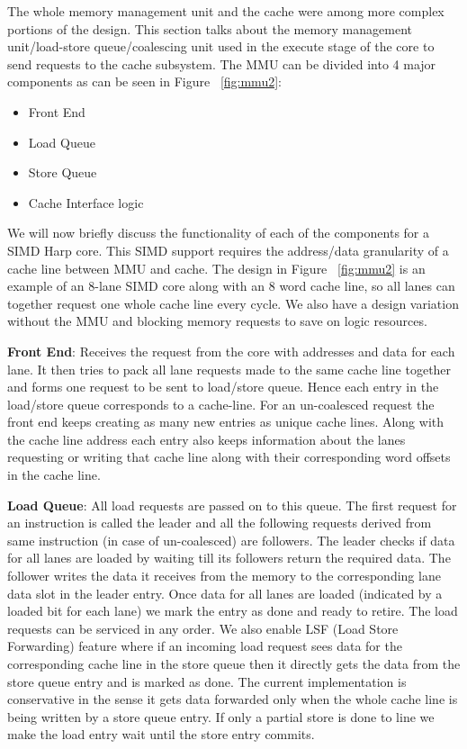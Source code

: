 The whole memory management unit and the cache were among more complex portions of the design. This section talks about the memory management unit/load-store queue/coalescing unit used in the execute stage of the core to send requests to the cache subsystem.  The MMU can be divided into 4 major components as can be seen in Figure ~\ref{fig:mmu2}:

\begin{itemize}
\item Front End
\item Load Queue
\item Store Queue
\item Cache Interface logic
\end{itemize}

We will now briefly discuss the functionality of each of the components for a SIMD Harp core. This SIMD support requires the address/data granularity of a cache line between MMU and cache. 
The design in Figure ~\ref{fig:mmu2} is an example of an 8-lane SIMD core along with an 8 word cache line, so all lanes can together request one whole cache line every cycle. We also have a design variation without the MMU and blocking memory requests to save on logic resources.


\noindent\textbf{Front End}: Receives the request from the core with addresses and data for each lane. It then tries to pack all lane requests made to the same cache line together and forms one request to be sent to load/store queue. Hence each entry in the load/store queue corresponds to a cache-line. For an un-coalesced request the front end keeps creating as many new entries as unique cache lines. Along with the cache line address each entry also keeps information about the lanes requesting or writing that cache line along with their corresponding word offsets in the cache line.

\noindent\textbf{Load Queue}: All load requests are passed on to this queue. The first request for an instruction is called the leader and all the following requests derived from same instruction (in case of un-coalesced) are followers. The leader checks if data for all lanes are loaded by waiting till its followers return the required data. The follower writes the data it receives from the memory to the corresponding lane data slot in the leader entry. Once data for all lanes are loaded (indicated by a loaded bit for each lane) we mark the entry as done and ready to retire. The load requests can be serviced in any order. We also enable LSF (Load Store Forwarding) feature where if an incoming load request sees data for the corresponding cache line in the store queue then it directly gets the data from the store queue entry and is marked as done. The current implementation is conservative in the sense it gets data forwarded only when the whole cache line is being written by a store queue entry. If only a partial store is done to line we make the load entry wait until the store entry commits.

